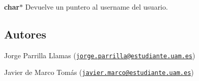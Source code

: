 \begin{DoxyItemize}
\item {\bfseries char$\ast$} Devuelve un puntero al username del usuario. 
\end{DoxyItemize}\hypertarget{server_return_user_authors_server_return_user}{}\subsection{Autores}\label{server_return_user_authors_server_return_user}

\begin{DoxyItemize}
\item Jorge Parrilla Llamas (\href{mailto:jorge.parrilla@estudiante.uam.es}{\tt jorge.\+parrilla@estudiante.\+uam.\+es}) 
\item Javier de Marco Tomás (\href{mailto:javier.marco@estudiante.uam.es}{\tt javier.\+marco@estudiante.\+uam.\+es}) 
\end{DoxyItemize}